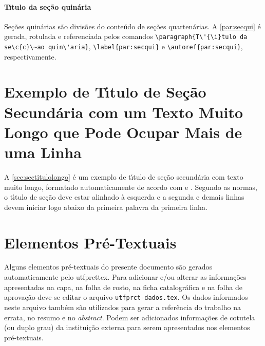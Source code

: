 \paragraph{T\'{\i}tulo da se\c{c}\~ao quin\'aria}\label{par:secqui}

Se\c{c}\~oes quin\'arias s\~ao divis\~oes do conte\'udo de se\c{c}\~oes quarten\'arias. A \autoref{par:secqui} \'e gerada, rotulada e referenciada pelos comandos \verb|\paragraph{T\'{\i}tulo da se\c{c}\~ao quin\'aria}|, \verb|\label{par:secqui}| e \verb|\autoref{par:secqui}|, respectivamente.

\section{Exemplo de T\'{\i}tulo de Se\c{c}\~ao Secund\'aria com um Texto Muito Longo que Pode Ocupar Mais de uma Linha}\label{sec:sectitulolongo}

A \autoref{sec:sectitulolongo} \'e um exemplo de t\'{\i}tulo de se\c{c}\~ao secund\'aria com texto muito longo, formatado automaticamente de acordo com  e . Segundo as normas, o t\'{\i}tulo de se\c{c}\~ao deve estar alinhado \`a esquerda e a segunda e demais linhas devem iniciar logo abaixo da primeira palavra da primeira linha.

\section{Elementos Pr\'e-Textuais}\label{sec:elempretext}

Alguns elementos pr\'e-textuais do presente documento s\~ao gerados automaticamente pelo \gls{utfprcttex}. Para adicionar e/ou alterar as informa\c{c}\~oes apresentadas na capa, na folha de rosto, na ficha catalogr\'afica e na folha de aprova\c{c}\~ao deve-se editar o arquivo \texttt{utfprct-dados.tex}. Os dados informados neste arquivo tamb\'em s\~ao utilizados para gerar a refer\^encia do trabalho na errata, no resumo e no \textit{abstract}. Podem ser adicionados informa\c{c}\~oes de cotutela (ou duplo grau) da institui\c{c}\~ao externa para serem apresentados nos elementos pr\'e-textuais.

